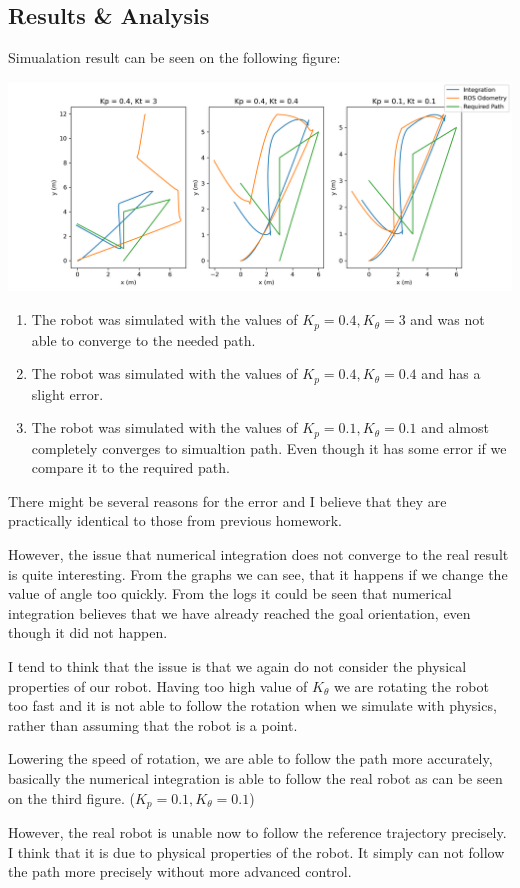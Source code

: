 \documentclass{article}
\begin{document}
\subsection*{Results \& Analysis}
Simualation result can be seen on the following figure:

\includegraphics[scale=0.4]{assets/trajectory.png}

\begin{enumerate}
    \item The robot was simulated with the values of $K_p=0.4, K_{\theta}=3$ and was not able to converge to the needed path.
    \item The robot was simulated with the values of $K_p=0.4, K_{\theta}=0.4$ and has a slight error.
    \item The robot was simulated with the values of $K_p=0.1, K_{\theta}=0.1$ and almost completely converges to simualtion path. 
    Even though it has some error if we compare it to the required path.
\end{enumerate}

There might be several reasons for the error and I believe that they are
practically identical to those from previous homework.

However, the issue that numerical integration does not converge to the real 
result is quite interesting. From the graphs we can see, that it happens
if we change the value of angle too quickly. From the logs it could be seen
that numerical integration believes that we have already reached the goal
orientation, even though it did not happen. 

I tend to think that the issue is that we again do not consider the physical 
properties of our robot. Having too high value of $K_{\theta}$ we are rotating
the robot too fast and it is not able to follow the rotation when we simulate
with physics, rather than assuming that the robot is a point.

Lowering the speed of rotation, we are able to follow the path more accurately, basically
the numerical integration is able to follow the real robot as can be seen on the third figure. ($K_p=0.1, K_{\theta}=0.1$)

However, the real robot is unable now to follow the reference trajectory precisely.
I think that it is due to physical properties of the robot. It simply can not
follow the path more precisely without more advanced control.
\end{document}
